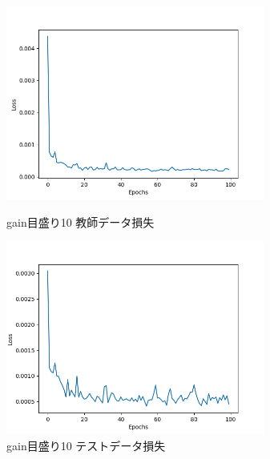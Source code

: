 \documentclass{jreport}		%
\begin{document}
\newpage
\begin{figure}[htbp]
 \begin{minipage}{0.5\hsize}
  \begin{center}
   \includegraphics[width=85mm]{gain10_loss.png}
  \end{center}
  \caption{gain目盛り10 教師データ損失}
  \label{fig:one}
 \end{minipage}
 \begin{minipage}{0.5\hsize}
  \begin{center}
   \includegraphics[width=85mm]{gain10_val_loss.png}
  \end{center}
  \caption{gain目盛り10 テストデータ損失}
  \label{fig:two}
 \end{minipage}
\end{figure}
\end{document}

